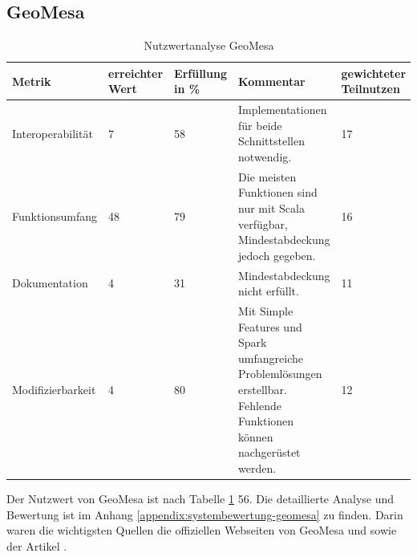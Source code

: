 \subsection{GeoMesa}
\begin{table}[h!]
\centering
\small
\begin{tabular}{|l|p{1.8cm}|l|p{3.1cm}|p{1.8cm}|}
\hline
\textbf{Metrik} & \textbf{erreichter Wert} & \textbf{Erfüllung in \%} & \textbf{Kommentar} & \textbf{gewichteter Teilnutzen} \\ \hline
Interoperabilität & 7 & 58 & Implementationen für beide Schnittstellen notwendig. & 17 \\ \hline
Funktionsumfang & 48 & 79 & Die meisten Funktionen sind nur mit Scala verfügbar, Mindestabdeckung jedoch gegeben. & 16 \\ \hline
Dokumentation & 4 & 31 & Mindestabdeckung nicht erfüllt. & 11 \\ \hline
Modifizierbarkeit & 4 & 80 & Mit Simple Features und Spark umfangreiche Problemlösungen erstellbar. Fehlende Funktionen können nachgerüstet werden. & 12 \\ \hline
\end{tabular}
\caption{Nutzwertanalyse GeoMesa}
\label{table:nutzwertanalyse-geomesa}
\end{table}
Der Nutzwert von GeoMesa ist nach Tabelle \ref{table:nutzwertanalyse-geomesa} 56.
Die detaillierte Analyse und Bewertung ist im Anhang \ref{appendix:systembewertung-geomesa} zu finden.
Darin waren die wichtigsten Quellen die offiziellen Webseiten von GeoMesa \cite{website:geomesa-tutorials} und \cite{website:geomesa-simplefeatures} sowie der Artikel \cite{website:geomesaeclipse}.

